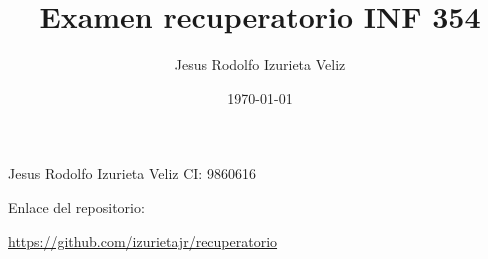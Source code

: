 \documentclass[letter]{article}
\author{Jesus Rodolfo Izurieta Veliz}
\date{\today}
\title{Examen recuperatorio INF 354}
\begin{document}
\maketitle
Jesus Rodolfo Izurieta Veliz
CI: 9860616

Enlace del repositorio:

\url{https://github.com/izurietajr/recuperatorio}
\end{document}
